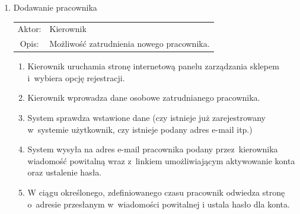 \begin{enumerate}
  
  \item Dodawanie pracownika \\
  \begin{tabularx}{\linewidth}{ c X }
  Aktor: & Kierownik \\
  Opis: & Możliwość zatrudnienia nowego pracownika.\\
  \end{tabularx}
   \begin{enumerate}
    \item Kierownik uruchamia stronę internetową panelu zarządzania sklepem
    i~wybiera opcję rejestracji.
    \item Kierownik wprowadza dane osobowe zatrudnianego pracownika.
    \item System sprawdza wstawione dane (czy istnieje już zarejestrowany
    w~systemie użytkownik, czy istnieje podany adres e-mail itp.)
    \item System wysyła na adres e-mail pracownika podany przez~kierownika
    wiadomość powitalną wraz z~linkiem umożliwiającym aktywowanie konta oraz
    ustalenie hasła.
    \item W ciągu określonego, zdefiniowanego czasu pracownik odwiedza stronę
    o~adresie przesłanym w~wiadomości powitalnej i ustala hasło dla konta.
  \end{enumerate}


\end{enumerate}
